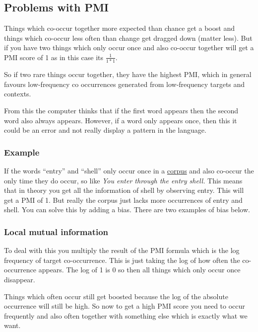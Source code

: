 \documentclass[
  11pt,
  british,
]{article}
\begin{document}
\hypertarget{problems-with-pmi}{%
\subsection{Problems with PMI}\label{problems-with-pmi}}

Things which co-occur together more expected than chance get a boost and
things which co-occur less often than change get dragged down (matter
less). But if you have two things which only occur once and also
co-occur together will get a PMI score of 1 as in this case its
\(\frac{1}{1*1}\).

So if two rare things occur together, they have the highest PMI, which
in general favours low-frequency co occurrences generated from
low-frequency targets and contexts.

From this the computer thinks that if the first word appears then the
second word also always appears. However, if a word only appears once,
then this it could be an error and not really display a pattern in the
language.

\hypertarget{example-2}{%
\subsubsection{Example}\label{example-2}}

If the words ``entry'' and ``shell'' only occur once in a
\href{../Data/Corpus.md}{corpus} and also co-occur the only time they do
occur, so like \emph{You enter through the entry shell.} This means that
in theory you get all the information of shell by observing entry. This
will get a PMI of 1. But really the corpus just lacks more occurrences
of entry and shell. You can solve this by adding a bias. There are two
examples of bias below.

\hypertarget{local-mutual-information}{%
\subsubsection{Local mutual
information}\label{local-mutual-information}}

To deal with this you multiply the result of the PMI formula which is
the log frequency of target co-occurrence. This is just taking the log
of how often the co-occurrence appears. The log of 1 is 0 so then all
things which only occur once disappear.

Things which often occur still get boosted because the log of the
absolute occurrence will still be high. So now to get a high PMI score
you need to occur frequently and also often together with something else
which is exactly what we want.
\end{document}
